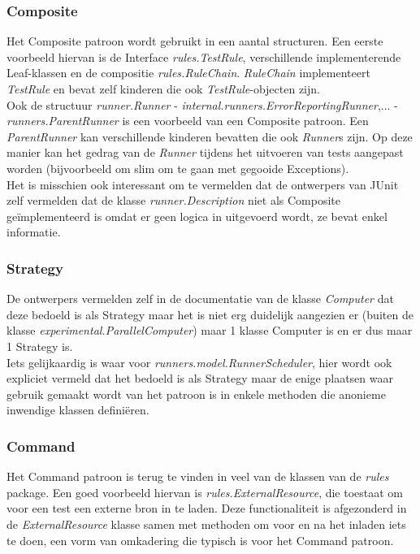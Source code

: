 \documentclass[i1]{oss}
\begin{document}
\subsubsection{Composite}
Het Composite patroon wordt gebruikt in een aantal structuren. Een eerste voorbeeld hiervan is de Interface \emph{rules.TestRule}, verschillende implementerende Leaf-klassen en de compositie \emph{rules.RuleChain}. 
\emph{RuleChain} implementeert \emph{TestRule} en bevat zelf kinderen die ook \emph{TestRule}-objecten zijn.
\\
Ook de structuur \emph{runner.Runner} - \emph{internal.runners.ErrorReportingRunner},... - \emph{runners.ParentRunner} is een voorbeeld van een Composite patroon. 
Een \emph{ParentRunner} kan verschillende kinderen bevatten die ook \emph{Runner}s zijn. 
Op deze manier kan het gedrag van de \emph{Runner} tijdens het uitvoeren van tests aangepast worden (bijvoorbeeld om slim om te gaan met gegooide Exceptions).
\\
Het is misschien ook interessant om te vermelden dat de ontwerpers van JUnit zelf vermelden dat de klasse \emph{runner.Description} niet als Composite ge\"implementeerd is omdat er geen logica in uitgevoerd wordt, ze bevat enkel informatie.

\subsubsection{Strategy}
De ontwerpers vermelden zelf in de documentatie van de klasse \emph{Computer} dat deze bedoeld is als Strategy maar het is niet erg duidelijk aangezien er (buiten de klasse \emph{experimental.ParallelComputer}) maar 1 klasse Computer is en er dus maar 1 Strategy is.
\\
Iets gelijkaardig is waar voor \emph{runners.model.RunnerScheduler}, hier wordt ook expliciet vermeld dat het bedoeld is als Strategy maar de enige plaatsen waar gebruik gemaakt wordt van het patroon is in enkele methoden die anonieme inwendige klassen defini\"eren.

\subsubsection{Command}
Het Command patroon is terug te vinden in veel van de klassen van de \emph{rules} package. 
Een goed voorbeeld hiervan is \emph{rules.ExternalResource}, die toestaat om voor een test een externe bron in te laden. 
Deze functionaliteit is afgezonderd in de \emph{ExternalResource} klasse samen met methoden om voor en na het inladen iets te doen, een vorm van omkadering die typisch is voor het Command patroon. 
\end{document}

